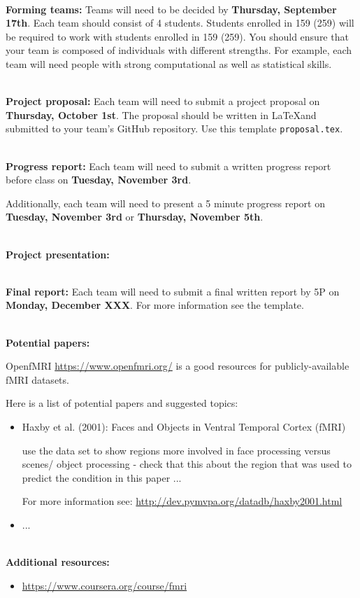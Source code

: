 \documentclass[11pt]{article}
\begin{document}
\textbf {\large \\ Forming teams:}
Teams will need to be decided by \textbf{Thursday, September 17th}.  Each team
should consist of 4 students.  Students enrolled in 159 (259) will be required to
work with students enrolled in 159 (259).  You should ensure that
your team is composed of individuals with different strengths.  For example,
each team will need people with strong computational as well as statistical skills.

\textbf {\large \\ Project proposal:}
Each team will need to submit a project proposal on \textbf{Thursday, October 1st}.
The proposal should be written in \LaTeX and submitted to your team's GitHub
repository.  Use this template \texttt{proposal.tex}.

\textbf {\large \\ Progress report:}
Each team will need to submit a written progress report before class on
\textbf{Tuesday, November 3rd}.

Additionally, each team will need to present a 5 minute progress report
on \textbf{Tuesday, November 3rd} or \textbf{Thursday,  November 5th}.

\textbf {\large \\ Project presentation:}

\textbf {\large \\ Final report:}
Each team will need to submit a final written report by 5P on
\textbf{Monday, December XXX}.  For more information see the
template.

\textbf {\large \\ Potential papers:}

OpenfMRI \url{https://www.openfmri.org/} is a good resources for publicly-available
fMRI datasets.

Here is a list of potential papers and suggested topics:

\begin{itemize}
\item Haxby et al. (2001): Faces and Objects in Ventral Temporal Cortex (fMRI)
      
      use the data set to show regions more involved in face processing versus
      scenes/ object processing - check that this about the region that was used to
      predict the condition in this paper ... 

      For more information see: \url{http://dev.pymvpa.org/datadb/haxby2001.html}

\item ...
\end{itemize}

\textbf {\large \\ Additional resources:}

\begin{itemize}
\item \url{https://www.coursera.org/course/fmri}
\end{itemize}
\end{document}
